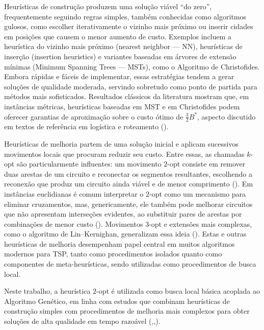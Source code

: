 Heurísticas de construção produzem uma solução viável ``do zero'',
frequentemente seguindo regras simples, também conhecidas como
algoritmos gulosos, como escolher iterativamente o vizinho mais próximo
ou inserir cidades em posições que causem o menor aumento de custo.
Exemplos incluem a heurística do vizinho mais próximo (nearest neighbor
--- NN), heurísticas de inserção (insertion heuristics) e variantes
baseadas em árvores de extensão mínimas (Minimum Spanning Trees ---
MSTs), como o Algoritmo de Christofides. Embora rápidas e fáceis de
implementar, essas estratégias tendem a gerar soluções de qualidade
moderada, servindo sobretudo como ponto de partida para métodos mais
sofisticados. Resultados clássicos da literatura mostram que, em
instâncias métricas, heurísticas baseadas em MST e em Christofides podem
oferecer garantias de aproximação sobre o custo ótimo de
\(\frac{3}{2}B^*\), aspecto discutido em textos de referência em
logística e roteamento ().

Heurísticas de melhoria partem de uma solução inicial e aplicam
sucessivos movimentos locais que procuram reduzir seu custo. Entre
essas, as chamadas \(k\)-opt são particularmente influentes: um
movimento \(2\)-opt consiste em remover duas arestas de um circuito e
reconectar os segmentos resultantes, escolhendo a reconexão que produz
um circuito ainda viável e de menor comprimento
(). Em instâncias euclidianas é comum
interpretar o \(2\)-opt como um mecanismo para eliminar cruzamentos,
mas, genericamente, ele também pode melhorar circuitos que não
apresentam interseções evidentes, ao substituir pares de arestas por
combinações de menor custo ().
Movimentos \(3\)-opt e extensões mais complexas, como o algoritmo de
Lin--Kernighan, generalizam essa ideia
(). Estas e outras heurísticas de
melhoria desempenham papel central em muitos algoritmos modernos para
TSP, tanto como procedimentos isolados quanto como componentes de
meta-heurísticas, sendo utilizadas como procedimentos de busca local.

Neste trabalho, a heurística \(2\)-opt é utilizada como busca local
básica acoplada ao Algoritmo Genético, em linha com estudos que combinam
heurísticas de construção simples com procedimentos de melhoria mais
complexos para obter soluções de alta qualidade em tempo razoável
(,,).

